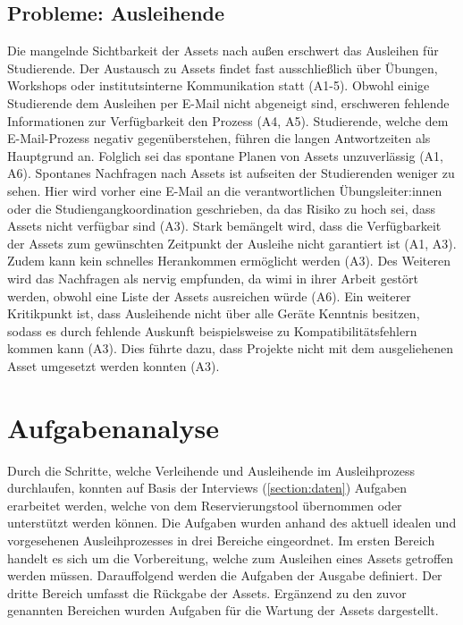 \subsection{Probleme: Ausleihende}
\label{section:probleme-Ausleihende}
Die mangelnde Sichtbarkeit der Assets nach außen erschwert das Ausleihen für Studierende. Der
Austausch zu Assets findet fast ausschließlich über Übungen, Workshops oder institutsinterne
Kommunikation statt (A1-5). Obwohl einige Studierende dem Ausleihen per E-Mail nicht abgeneigt sind,
erschweren fehlende Informationen zur Verfügbarkeit den Prozess (A4, A5). Studierende, welche dem
E-Mail-Prozess negativ gegenüberstehen, führen die langen Antwortzeiten als Hauptgrund an. Folglich
sei das spontane Planen von Assets unzuverlässig (A1, A6). Spontanes Nachfragen nach Assets ist
aufseiten der Studierenden weniger zu sehen. Hier wird vorher eine E-Mail an die verantwortlichen
Übungsleiter:innen oder die Studiengangkoordination geschrieben, da das Risiko zu hoch sei, dass
Assets nicht verfügbar sind (A3). Stark bemängelt wird, dass die Verfügbarkeit der Assets zum
gewünschten Zeitpunkt der Ausleihe nicht garantiert ist (A1, A3). Zudem kann kein schnelles
Herankommen ermöglicht werden (A3). Des Weiteren wird das Nachfragen als nervig empfunden, da
\ac{wimi} in ihrer Arbeit gestört werden, obwohl eine Liste der Assets ausreichen würde (A6). Ein
weiterer Kritikpunkt ist, dass Ausleihende nicht über alle Geräte Kenntnis besitzen, sodass es durch
fehlende Auskunft beispielsweise zu Kompatibilitätsfehlern kommen kann (A3). Dies führte dazu, dass
Projekte nicht mit dem ausgeliehenen Asset umgesetzt werden konnten (A3).

\section{Aufgabenanalyse}
\label{section:aufgaben}
Durch die Schritte, welche Verleihende und Ausleihende im Ausleihprozess durchlaufen, konnten auf
Basis der Interviews (\ref{section:daten}) Aufgaben erarbeitet werden, welche von dem
Reservierungstool übernommen oder unterstützt werden können. Die Aufgaben wurden anhand des aktuell
idealen und vorgesehenen Ausleihprozesses in drei Bereiche eingeordnet. Im ersten Bereich handelt es
sich um die Vorbereitung, welche zum Ausleihen eines Assets getroffen werden müssen. Darauffolgend
werden die Aufgaben der Ausgabe definiert. Der dritte Bereich umfasst die Rückgabe der Assets.
Ergänzend zu den zuvor genannten Bereichen wurden Aufgaben für die Wartung der Assets dargestellt.


